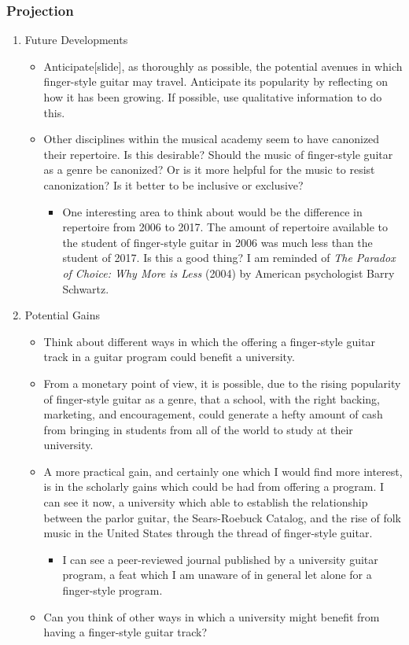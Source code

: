 \documentclass[11pt]{article}
\begin{document}
\subsubsection{Projection}
\label{sec-1-2-2}
\begin{enumerate}
\item Future Developments
\label{sec-1-2-2-1}
\begin{itemize}
\item Anticipate[slide], as thoroughly as possible, the potential avenues in
which finger-style guitar may travel. Anticipate its popularity by
reflecting on how it has been growing. If possible, use qualitative
information to do this.

\item Other disciplines within the musical academy seem to have canonized their
repertoire. Is this desirable? Should the music of finger-style guitar as a
genre be canonized? Or is it more helpful for the music to resist
canonization? Is it better to be inclusive or exclusive?
\begin{itemize}
\item One interesting area to think about would be the difference in repertoire
from 2006 to 2017. The amount of repertoire available to the student of
finger-style guitar in 2006 was much less than the student of 2017. Is
this a good thing? I am reminded of \emph{The Paradox of Choice: Why More is
Less} (2004) by American psychologist Barry Schwartz.
\end{itemize}
\end{itemize}

\item Potential Gains
\label{sec-1-2-2-2}
\begin{itemize}
\item Think about different ways in which the offering a finger-style guitar track
in a guitar program could benefit a university.
\item From a monetary point of view, it is possible, due to the rising popularity
of finger-style guitar as a genre, that a school, with the right backing,
marketing, and encouragement, could generate a hefty amount of cash from
bringing in students from all of the world to study at their university.
\item A more practical gain, and certainly one which I would find more interest,
is in the scholarly gains which could be had from offering a program. I can
see it now, a university which able to establish the relationship between
the parlor guitar, the Sears-Roebuck Catalog, and the rise of folk music in
the United States through the thread of finger-style guitar.
\begin{itemize}
\item I can see a peer-reviewed journal published by a university guitar
program, a feat which I am unaware of in general let alone for a
finger-style program.
\end{itemize}
\item Can you think of other ways in which a university might benefit from having
a finger-style guitar track?
\end{itemize}
\end{enumerate}
\end{document}
